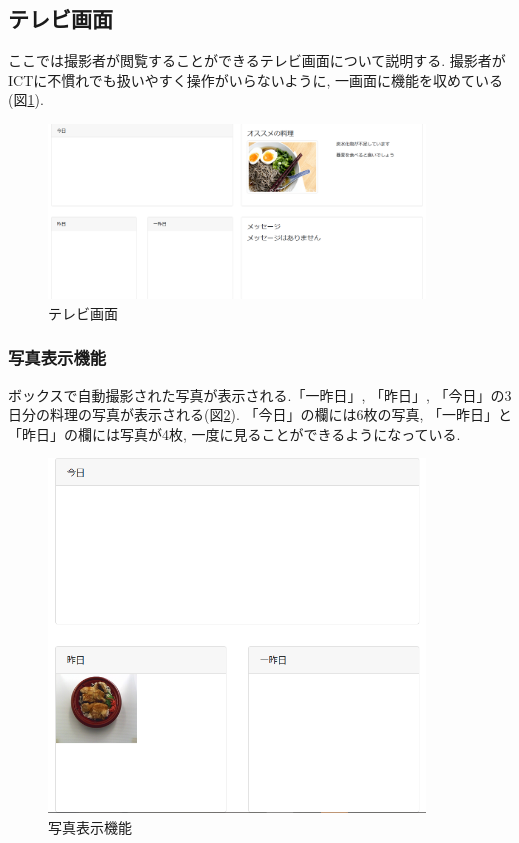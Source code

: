 \documentclass[../report]{subfiles}
\begin{document}
\subsection{テレビ画面}
ここでは撮影者が閲覧することができるテレビ画面について説明する.
撮影者がICTに不慣れでも扱いやすく操作がいらないように, 一画面に機能を収めている(図\ref{fig:tv-all}).
\begin{figure}[htbp]
    \begin{center}
        \includegraphics[width=10cm]{imgs/5_tv.png}
        \caption{テレビ画面}
        \label{fig:tv-all}
    \end{center}
\end{figure}

\subsubsection{写真表示機能}
ボックスで自動撮影された写真が表示される.「一昨日」, 「昨日」, 「今日」の3日分の料理の写真が表示される(図\ref{fig:tv-days}).
「今日」の欄には6枚の写真, 「一昨日」と「昨日」の欄には写真が4枚, 一度に見ることができるようになっている.
\begin{figure}[htbp]
    \begin{center}
        \includegraphics[width=10cm]{imgs/5_tv1.png}
        \caption{写真表示機能}
        \label{fig:tv-days}
    \end{center}
\end{figure}
\end{document}
